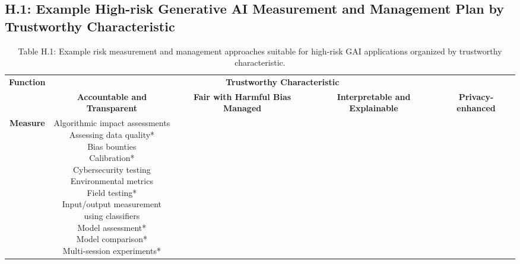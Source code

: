 \documentclass[fleqn]{article}
\begin{document}
\begin{landscape}
\subsection*{H.1: Example High-risk Generative AI Measurement and Management Plan by Trustworthy Characteristic}\label{appdxh1}

\begin{table}[H]
	\caption*{Table H.1: Example risk measurement and management approaches suitable for high-risk GAI applications organized by trustworthy characteristic.}
	\footnotesize
	\begin{tabular}{|c|c|c|c|c|}
		\hline
		\multirow{2}{*}{\textbf{Function}} & \multicolumn{4}{|c|}{\textbf{Trustworthy Characteristic}}   \\
		\cline{2-5}
		& \textbf{Accountable and Transparent} & \textbf{Fair with Harmful Bias Managed} & \textbf{Interpretable and Explainable} & \textbf{Privacy-enhanced} \\
		\hline
		\textbf{Measure} & \makecell[l]{
			\textbullet\hspace{3pt} Algorithmic impact assessments \\ 
			\textbullet\hspace{3pt} Assessing data quality*\\ 
			\textbullet\hspace{3pt} Bias bounties \\ 
			\textbullet\hspace{3pt} Calibration*\\ 
			\textbullet\hspace{3pt} Cybersecurity testing \\ 
			\textbullet\hspace{3pt} Environmental metrics \\ 
			\textbullet\hspace{3pt} Field testing*\\ 
			\textbullet\hspace{3pt} Input/output measurement\\\hspace{10pt}using classifiers \\ 
			\textbullet\hspace{3pt} Model assessment*\\ 
			\textbullet\hspace{3pt} Model comparison*\\ 
			\textbullet\hspace{3pt} Multi-session experiments*\\ 
}
\end{tabular}
\end{table}
\end{landscape}
\end{document}
